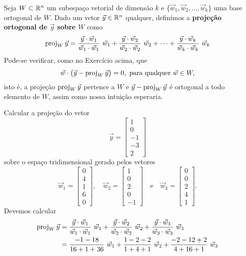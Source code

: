 \documentclass[../livro.tex]{subfiles}  %
\begin{document}
Seja $W \subset \mathbb{R}^n$ um subespaço vetorial de dimensão $k$ e $\{\vec{w}_1, \vec{w}_2, \dots, \vec{w}_k \}$ uma base ortogonal de $W$. Dado um vetor $\vec{y} \in \mathbb{R}^n$ qualquer, definimos a \textbf{projeção ortogonal de $\vec{y}$ sobre $W$} como
\[
\proj_W \vec{y}  = \frac{\vec{y} \cdot \vec{w}_1}{\vec{w}_1 \cdot \vec{w}_1} \ \vec{w}_1 + \frac{\vec{y} \cdot \vec{w}_2}{\vec{w}_2 \cdot \vec{w}_2} \ \vec{w}_2 + \cdots + \frac{\vec{y} \cdot \vec{w}_k}{\vec{w}_k \cdot \vec{w}_k} \ \vec{w}_k
\] Pode-se verificar, como no Exercício acima, que
\[
\vec{w} \cdot  \big( \vec{y} - \operatorname{proj}_W \vec{y} \big) = 0, \ \text{para qualquer } \vec{w} \in W,
\] isto é, a projeção $\operatorname{proj}_W \vec{y}$ pertence a $W$ e $\vec{y} - \operatorname{proj}_W \vec{y}$ é ortogonal a todo elemento de $W$, assim como nossa intuição esperaria.


\begin{example}
Calcular a projeção do vetor
\[
\vec{y} =
\begin{bmatrix}
1 \\ 0 \\ -1 \\ -3 \\ 2
\end{bmatrix}
\] sobre o espaço tridimensional gerado pelos vetores
\[
\vec{w}_1 =
\begin{bmatrix}
 0\\4\\1 \\ 6 \\0
\end{bmatrix}, \quad
\vec{w}_2 =
\begin{bmatrix}
 1\\0\\2\\0\\-1
\end{bmatrix} \quad \text{e} \quad
\vec{w}_3 =
\begin{bmatrix}
 0\\0\\2\\4\\ 1
\end{bmatrix}.
\] Devemos calcular
\[
\begin{split}
\proj_W \vec{y} & = \frac{\vec{y} \cdot \vec{w}_1}{\vec{w}_1 \cdot \vec{w}_1} \ \vec{w}_1 + \frac{\vec{y} \cdot \vec{w}_2}{\vec{w}_2 \cdot \vec{w}_2} \ \vec{w}_2 + \frac{\vec{y} \cdot \vec{w}_3}{\vec{w}_3 \cdot \vec{w}_3} \ \vec{w}_3\\
                & = \frac{ - 1 -18 }{ 16 + 1 + 36 } \ \vec{w}_1 + \frac{ 1 - 2 - 2 }{ 1 + 4 + 1 } \ \vec{w}_2 + \frac{ -2-12+2 }{ 4 + 16 + 1 } \ \vec{w}_3 \\

\end{split}\]
\end{example}
\end{document}
